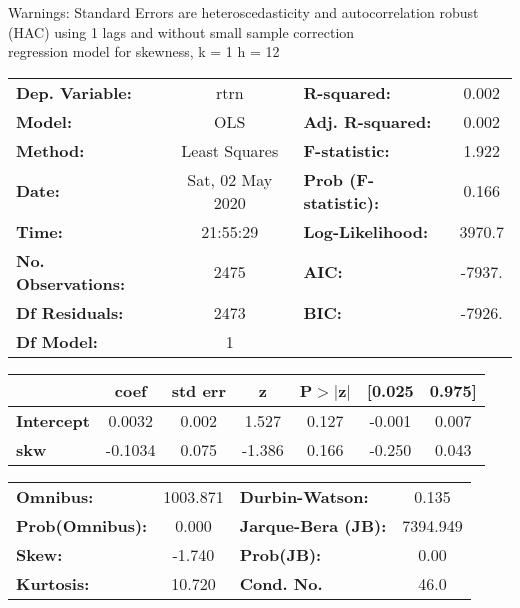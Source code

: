 Warnings: \newline
 [1] Standard Errors are heteroscedasticity and autocorrelation robust (HAC) using 1 lags and without small sample correction\\ 

regression model for skewness, k = 1 h = 12\begin{center}
\begin{tabular}{lclc}
\toprule
\textbf{Dep. Variable:}    &       rtrn       & \textbf{  R-squared:         } &     0.002   \\
\textbf{Model:}            &       OLS        & \textbf{  Adj. R-squared:    } &     0.002   \\
\textbf{Method:}           &  Least Squares   & \textbf{  F-statistic:       } &     1.922   \\
\textbf{Date:}             & Sat, 02 May 2020 & \textbf{  Prob (F-statistic):} &    0.166    \\
\textbf{Time:}             &     21:55:29     & \textbf{  Log-Likelihood:    } &    3970.7   \\
\textbf{No. Observations:} &        2475      & \textbf{  AIC:               } &    -7937.   \\
\textbf{Df Residuals:}     &        2473      & \textbf{  BIC:               } &    -7926.   \\
\textbf{Df Model:}         &           1      & \textbf{                     } &             \\
\bottomrule
\end{tabular}
\begin{tabular}{lcccccc}
                   & \textbf{coef} & \textbf{std err} & \textbf{z} & \textbf{P$> |$z$|$} & \textbf{[0.025} & \textbf{0.975]}  \\
\midrule
\textbf{Intercept} &       0.0032  &        0.002     &     1.527  &         0.127        &       -0.001    &        0.007     \\
\textbf{skw}       &      -0.1034  &        0.075     &    -1.386  &         0.166        &       -0.250    &        0.043     \\
\bottomrule
\end{tabular}
\begin{tabular}{lclc}
\textbf{Omnibus:}       & 1003.871 & \textbf{  Durbin-Watson:     } &    0.135  \\
\textbf{Prob(Omnibus):} &   0.000  & \textbf{  Jarque-Bera (JB):  } & 7394.949  \\
\textbf{Skew:}          &  -1.740  & \textbf{  Prob(JB):          } &     0.00  \\
\textbf{Kurtosis:}      &  10.720  & \textbf{  Cond. No.          } &     46.0  \\
\bottomrule
\end{tabular}
\end{center}

